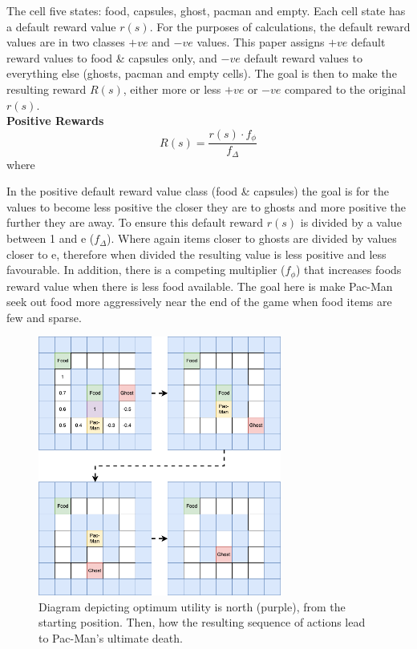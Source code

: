 \documentclass[letterpaper, 11pt, journal, final]{IEEEtran}
\begin{document}
The cell five states: food, capsules, ghost, pacman and empty. Each cell state has a default reward value \(r(s)\). For the purposes of calculations, the default reward values are in two classes \(+ve\) and \(-ve\) values. This paper assigns \(+ve\) default reward values to food \& capsules only, and \(-ve\) default reward values to everything else (ghosts, pacman and empty cells). The goal is then to make the resulting reward \(R(s)\), either more or less \(+ve\) or \(-ve\) compared to the original \(r(s)\).\\

\textbf{Positive Rewards}
\[R(s) = \frac{r(s) \cdot f_\phi}{f_\Delta}\]
where
\begin{description}
\item[s \(\in\) \{food, capsule\}]
\item
\end{description}
In the positive default reward value class (food \& capsules) the goal is for the values to become less positive the closer they are to ghosts and more positive the further they are away. To ensure this default reward \(r(s)\) is  divided by a value between 1 and e  (\(f_\Delta\)). Where again items closer to ghosts are divided by values closer to e, therefore when divided the resulting value is less positive and less favourable. In addition, there is a competing multiplier (\(f_\phi\)) that increases foods reward value when there is less food available. The goal here is make Pac-Man seek out food more aggressively near the end of the game when food items are few and sparse.\\

\begin{figure}[ht]
    \centering
    \includegraphics[width=8cm]{pre_manhattan.png}
    \caption{Diagram depicting optimum utility is north (purple), from the starting position. Then, how the resulting sequence of actions lead to Pac-Man's ultimate death.}
    \label{fig:pre_manhattan}
\end{figure}
\end{document}
